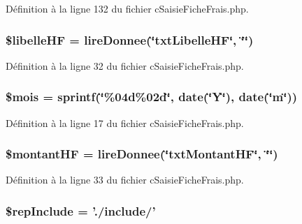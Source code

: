 Définition à la ligne 132 du fichier c\-Saisie\-Fiche\-Frais.\-php.

\hypertarget{c_saisie_fiche_frais_8php_a5c651e0f3d29d0049ca4d2e5ad8db5da}{
\subsubsection[{\$libelle\-H\-F}]{\setlength{\rightskip}{0pt plus 5cm}\$libelle\-H\-F = {\bf lire\-Donnee}(\char`\"{}txt\-Libelle\-H\-F\char`\"{}, \char`\"{}\char`\"{})}}\label{c_saisie_fiche_frais_8php_a5c651e0f3d29d0049ca4d2e5ad8db5da}


Définition à la ligne 32 du fichier c\-Saisie\-Fiche\-Frais.\-php.

\hypertarget{c_saisie_fiche_frais_8php_ac3dd350c90be7c45f992a6efde984c66}{
\subsubsection[{\$mois}]{\setlength{\rightskip}{0pt plus 5cm}\$mois = sprintf(\char`\"{}\%04d\%02d\char`\"{}, date(\char`\"{}\-Y\char`\"{}), date(\char`\"{}m\char`\"{}))}}\label{c_saisie_fiche_frais_8php_ac3dd350c90be7c45f992a6efde984c66}


Définition à la ligne 17 du fichier c\-Saisie\-Fiche\-Frais.\-php.

\hypertarget{c_saisie_fiche_frais_8php_afb61cb595292a2af29810acbc2fde126}{
\subsubsection[{\$montant\-H\-F}]{\setlength{\rightskip}{0pt plus 5cm}\$montant\-H\-F = {\bf lire\-Donnee}(\char`\"{}txt\-Montant\-H\-F\char`\"{}, \char`\"{}\char`\"{})}}\label{c_saisie_fiche_frais_8php_afb61cb595292a2af29810acbc2fde126}


Définition à la ligne 33 du fichier c\-Saisie\-Fiche\-Frais.\-php.

\hypertarget{c_saisie_fiche_frais_8php_aad2a80747c2de66b59cb18d493ae7a8b}{
\subsubsection[{\$rep\-Include}]{\setlength{\rightskip}{0pt plus 5cm}\$rep\-Include = './include/'}}\label{c_saisie_fiche_frais_8php_aad2a80747c2de66b59cb18d493ae7a8b}


